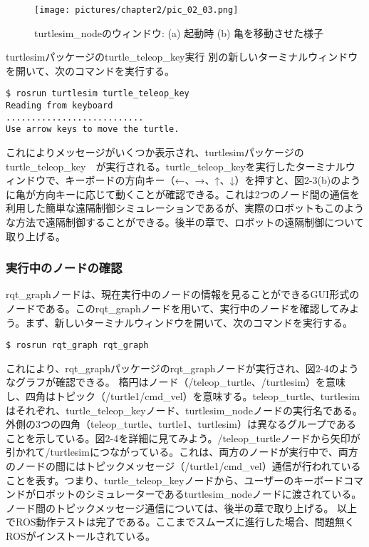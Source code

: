 \begin{figure}[h]
  \centering
  \texttt{[image: pictures/chapter2/pic\_02\_03.png]}
  \caption{turtlesim\_nodeのウィンドウ: (a) 起動時 (b) 亀を移動させた様子}
\end{figure}

turtlesimパッケージのturtle\_teleop\_key実行
別の新しいターミナルウィンドウを開いて、次のコマンドを実行する。

\begin{lstlisting}[language=ROS]
$ rosrun turtlesim turtle_teleop_key
Reading from keyboard
...........................
Use arrow keys to move the turtle.
\end{lstlisting}

これによりメッセージがいくつか表示され、turtlesimパッケージのturtle\_teleop\_key　が実行される。turtle\_teleop\_keyを実行したターミナルウィンドウで、キーボードの方向キー（←、→、↑、↓）を押すと、図2-3(b)のように亀が方向キーに応じて動くことが確認できる。これは2つのノード間の通信を利用した簡単な遠隔制御シミュレーションであるが、実際のロボットもこのような方法で遠隔制御することができる。後半の章で、ロボットの遠隔制御について取り上げる。

\subsubsection{実行中のノードの確認}

rqt\_graphノードは、現在実行中のノードの情報を見ることができるGUI形式のノードである。このrqt\_graphノードを用いて、実行中のノードを確認してみよう。まず、新しいターミナルウィンドウを開いて、次のコマンドを実行する。

\begin{lstlisting}[language=ROS]
$ rosrun rqt_graph rqt_graph
\end{lstlisting}

これにより、rqt\_graphパッケージのrqt\_graphノードが実行され、図2-4のようなグラフが確認できる。
楕円はノード（/teleop\_turtle、/turtlesim）を意味し、四角はトピック（/turtle1/cmd\_vel）を意味する。teleop\_turtle、turtlesim はそれぞれ、turtle\_teleop\_keyノード、turtlesim\_nodeノードの実行名である。外側の3つの四角（teleop\_turtle、turtle1、turtlesim）は異なるグループであることを示している。図2-4を詳細に見てみよう。/teleop\_turtleノードから矢印が引かれて/turtlesimにつながっている。これは、両方のノードが実行中で、両方のノードの間にはトピックメッセージ（/turtle1/cmd\_vel）通信が行われていることを表す。つまり、turtle\_teleop\_keyノードから、ユーザーのキーボードコマンドがロボットのシミュレーターであるturtlesim\_nodeノードに渡されている。ノード間のトピックメッセージ通信については、後半の章で取り上げる。
以上でROS動作テストは完了である。ここまでスムーズに進行した場合、問題無くROSがインストールされている。

